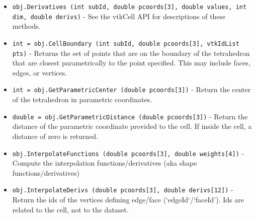 \begin{itemize}
\item  \verb|obj.Derivatives (int subId, double pcoords[3], double values, int dim, double derivs)| -  See the vtkCell API for descriptions of these methods.

\item  \verb|int = obj.CellBoundary (int subId, double pcoords[3], vtkIdList pts)| -  Returns the set of points that are on the boundary of the tetrahedron that
 are closest parametrically to the point specified. This may include faces,
 edges, or vertices.

\item  \verb|int = obj.GetParametricCenter (double pcoords[3])| -  Return the center of the tetrahedron in parametric coordinates.

\item  \verb|double = obj.GetParametricDistance (double pcoords[3])| -  Return the distance of the parametric coordinate provided to the
 cell. If inside the cell, a distance of zero is returned.

\item  \verb|obj.InterpolateFunctions (double pcoords[3], double weights[4])| -  Compute the interpolation functions/derivatives
 (aka shape functions/derivatives)

\item  \verb|obj.InterpolateDerivs (double pcoords[3], double derivs[12])| -  Return the ids of the vertices defining edge/face (`edgeId`/`faceId').
 Ids are related to the cell, not to the dataset.

\end{itemize}
